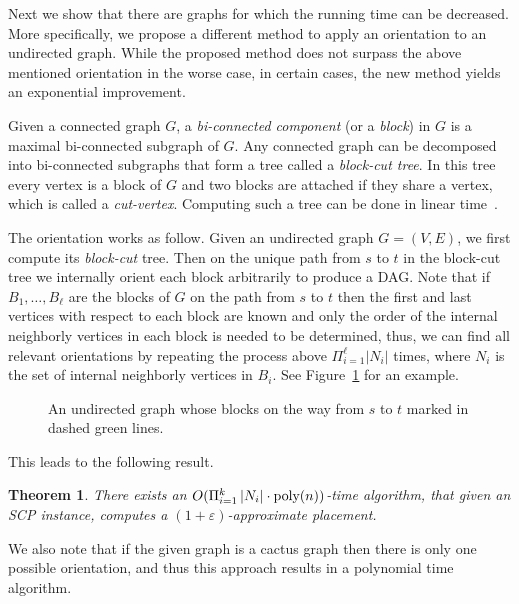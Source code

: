 \documentclass[11pt]{article}
\newtheorem{theorem}{Theorem}
\newcommand{\abs}[1]{\left| #1 \right|}
\newcommand{\eps}{\varepsilon}
\newcommand{\scp}{\textsc{SCP}\xspace}
\begin{document}
Next we show that there are graphs for which the running time can be
decreased.  More specifically, we propose a different method to apply
an orientation to an undirected graph.  While the proposed method does
not surpass the above mentioned orientation in the worse case, in
certain cases, the new method yields an exponential improvement.

Given a connected graph $G$, a \emph{bi-connected component} (or a
\emph{block}) in $G$ is a maximal bi-connected subgraph of $G$.  Any
connected graph can be decomposed into bi-connected subgraphs that
form a tree called a \emph{block-cut tree}.  In this tree every vertex
is a block of $G$ and two blocks are attached if they share a vertex,
which is called a \emph{cut-vertex}.
%
Computing such a tree can be done in linear
time~\cite{HopcroftTarjan73}.

The orientation works as follow.  Given an undirected graph $G =
(V,E)$, we first compute its \emph{block-cut} tree.  Then on the
unique path from $s$ to $t$ in the block-cut tree we internally orient
each block arbitrarily to produce a DAG.
%
Note that if $B_1, \ldots, B_\ell$ are the blocks of $G$ on the path
from $s$ to $t$ then the first and last vertices with respect to each
block are known and only the order of the internal neighborly vertices
in each block is needed to be determined, thus, we can find all
relevant orientations by repeating the process above $\Pi_{i = 1}^\ell
\abs{N_i}$ times, where $N_i$ is the set of internal neighborly
vertices in $B_i$.  See Figure~\ref{fig:or2} for an example.

\begin{figure}[t]
\begin{center}

\end{center}
\caption{An undirected graph whose blocks on the way from $s$ to $t$
  marked in dashed green lines.
\label{fig:or2}
}
\end{figure}   

This leads to the following result.

\begin{theorem}
There exists an $O(\Pi_{i = 1}^k \abs{N_i} \cdot \text{\rm
  poly}(n))$-time algorithm, that given an \scp instance, computes a
$(1+\eps)$-approximate placement.
\end{theorem}

We also note that if the given graph is a cactus graph then there is
only one possible orientation, and thus this approach results in a
polynomial time algorithm.
\end{document}
